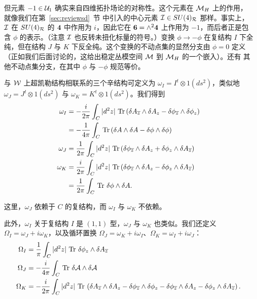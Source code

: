 但元素 $-1\in {\cal U}_1$ 确实来自四维拓扑场论的对称性。这个元素在 $\MH$ 上的作用，就像我们在第~\ref{sec:reviewsd}~节 中引入的中心元素 ${\EUI}\in SU(4)_{\cal R}$ 那样。事实上，${\EUI}$ 在 $SU(4)_{{\cal R}}$ 的 ${\bf 4}$ 中作用为 $i$，因此它在 ${\bf 6}=\wedge^2{\bf 4}$ 上作用为 $-1$，而后者正是包含 $\phi$ 的表示。（注意 ${\EUI}$ 也反转未扭化标量的符号。）变换 $\phi\to-\phi$ 在复结构 $I$ 下全纯，但在结构 $J$ 与 $K$ 下反全纯。这个变换的不动点集的显然分支由 $\phi=0$ 定义（正如我们后面讨论的，这给出稳定丛模空间 $\M$ 到 $\MH$ 的一个嵌入）。还有 \cite{ref20} 其他不动点集分支，在其中 $\phi$ 与 $-\phi$ 规范等价。

\par{}

与 $\EUW$ 上超凯勒结构相联系的三个辛结构可定义为 $\omega_I = I^t\otimes 1(ds^2)$，类似地 $\omega_J=J^t\otimes 1(ds^2)$ 与 $\omega_K=K^t\otimes 1(ds^2)$。我们得到%
\setcounter{equation}{7}
\begin{equation}\label{eq:tomog}
\begin{aligned}\omega_I
& = -{i\over 2\pi}\int_C|d^2z|\,\Tr\left(\delta A_{\bar z}\wedge
\delta A_z-\delta \phi_{\bar z}\wedge \delta\phi_z\right)\\
&=-{1\over 4\pi}\int_C\,\Tr\left(\delta A\wedge \delta A
-\delta\phi\wedge\delta \phi\right) \\
                      \omega_J & ={1\over 2\pi}\int_C |d^2z|\,\Tr\left(
                      \delta\phi_{\bar z}\wedge \delta A_z+\delta\phi_z\wedge
                      \delta A_{\bar z} \right)\\
                      \omega_K & =
                      {i\over 2\pi}\int_C|d^2z|\,\Tr\left(\delta\phi_{\bar z}
                      \wedge\delta A_z-\delta\phi_z\wedge\delta A_{\bar z}\right)\\
                      & = {1\over 2\pi}\int_C \,\Tr\,\delta\phi
                      \wedge\delta A.\\\end{aligned}
\end{equation}

这里，$\omega_J$ 依赖于 $C$ 的复结构，而 $\omega_I$ 与 $\omega_K$ 不依赖。

此外，$\omega_I$ 关于复结构 $I$ 是 $(1,1)$ 型，$\omega_J$ 与 $\omega_K$ 也类似。我们还定义 $\Omega_I=\omega_J+i\omega_K$，以及循环置换 $\Omega_J=\omega_K+i\omega_I$、$\Omega_K=\omega_I+i\omega_J$：
\setcounter{equation}{8}
\begin{equation}\label{eq:ninto}
\begin{aligned}\Omega_I & =
{1\over \pi}\int_C|d^2z|\,\Tr\,\delta\phi_z\wedge \delta A_{\bar
z} \\
        \Omega_J & =-{i\over 4\pi}\int_C\,\Tr\,\delta \CA\wedge\delta \CA          \\
        \Omega_K & = -{i\over 2\pi}\int_C |d^2z|\,\Tr\,\left( \delta A_{\bar z}\wedge
\delta A_z-\delta \phi_{\bar z}\wedge \delta\phi_z -
\delta\phi_{\bar z}\wedge \delta A_z-\delta\phi_z\wedge
                      \delta A_{\bar z}\right).\\\end{aligned}
\end{equation}

